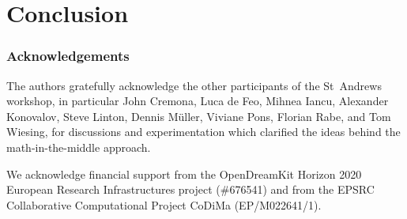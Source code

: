 \section{Conclusion}
\label{sec:concl}
\subsubsection*{Acknowledgements}

The authors gratefully acknowledge the other participants of the
St~Andrews workshop, in particular John Cremona, Luca de Feo, Mihnea
Iancu, Alexander Konovalov, Steve Linton, Dennis M\"uller, Viviane
Pons, Florian Rabe, and Tom Wiesing, for discussions and
experimentation which clarified the ideas behind the
math-in-the-middle approach.

We acknowledge financial support from the OpenDreamKit Horizon 2020 European Research
Infrastructures project (\#676541) and from the EPSRC Collaborative Computational Project
CoDiMa (EP/M022641/1).



